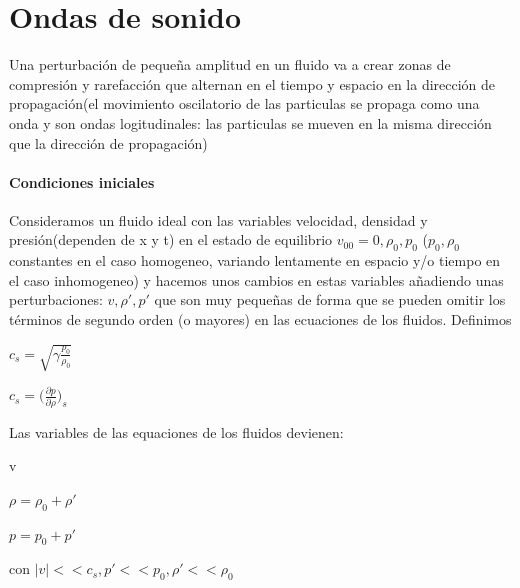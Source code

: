 \documentclass{article}
\begin{document}
\section{Ondas de sonido}
Una perturbación de pequeña amplitud en un fluido va a crear zonas de compresión y rarefacción que alternan en el tiempo y espacio en la dirección de propagación(el movimiento oscilatorio de las particulas se propaga como una onda y son ondas logitudinales:  las particulas se mueven en la misma dirección que la dirección de propagación)

\paragraph{Condiciones iniciales}
Consideramos un fluido ideal con las variables velocidad, densidad y presión(dependen de x y t) en el estado de equilibrio 
$v_{00} = 0, \rho_0 , p_0$ ($p_0, \rho_0$ constantes en el caso homogeneo, variando lentamente en espacio y/o tiempo en el caso inhomogeneo)
 y hacemos unos cambios en estas variables añadiendo unas perturbaciones:
$ v, \rho\prime, p\prime $ 
que  son muy pequeñas de forma que se pueden omitir los términos de segundo orden (o mayores) en las ecuaciones de los fluidos.
Definimos 
\begin{description}  
 \item $c_s = \sqrt{\gamma \frac{p_0}{\rho_0}}$

 \item $c_s  =\big( \frac{\partial p}{\partial \rho}\big)_s  $

\end{description}  

Las variables de las equaciones de los fluidos devienen:

\begin{description}  
\item v
\item $\rho = \rho_0 + \rho\prime$
\item $p = p_0 + p\prime$

 
\end{description}  

con $|v|<<c_s, p\prime<<p_0 , \rho\prime << \rho_0$ 
\end{document}

